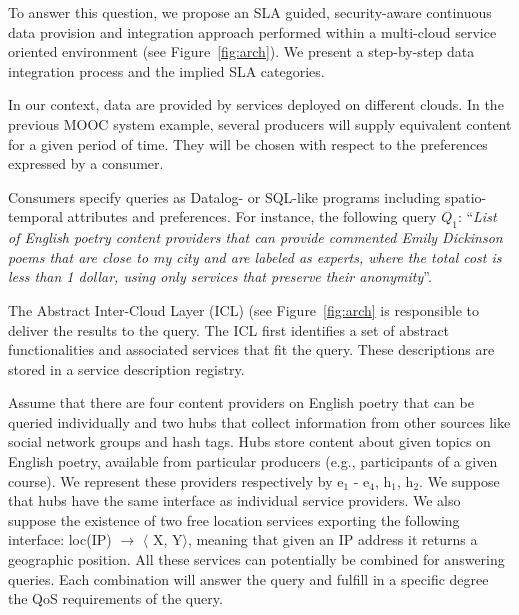 To answer this question, we propose an SLA guided, security-aware continuous data provision and integration approach performed within a multi-cloud service oriented environment  (see
Figure~\ref{fig:arch}). 
We present a step-by-step data integration process and the implied  SLA categories.

In our context, data are provided by services deployed on different clouds. 
In the previous   MOOC system example, several producers will supply equivalent content for a given period of time. 
They will be chosen with respect to the  preferences expressed by a consumer. 

Consumers  specify queries as Datalog- or SQL-like programs including spatio-temporal attributes and preferences.
For instance, the following query $Q_1$: ``\textit{List of English poetry content providers that can provide commented Emily Dickinson poems that are close to my city and are labeled as experts, where the total cost is less than 1 dollar, using only services that preserve their anonymity}''. 

The Abstract Inter-Cloud Layer (ICL) (see Figure~\ref{fig:arch} is responsible to deliver the results to the  query. 
The ICL  first identifies a set of abstract functionalities  and associated services that fit the  query. These descriptions are stored in a service description registry.

Assume that there are four content providers on English poetry that can be queried individually and two hubs that collect information from other sources like social network groups and hash tags.
Hubs  store content about given topics on  English poetry, available from particular producers (e.g., participants of a given course).
We represent these providers respectively by { e$_1$ - e$_4$}, {h$_1$}, {h$_2$}. 
We suppose that hubs  have the same interface as individual service providers.
We also suppose the existence of two free location services exporting the following interface: {loc(IP) $\rightarrow$ $\langle$ X, Y$\rangle$}, meaning that given an IP address it returns a geographic position.
All these services can potentially be combined for answering queries. Each combination will answer the query and fulfill in a specific degree the QoS requirements of the query.




\begin{figure}
\end{figure}


